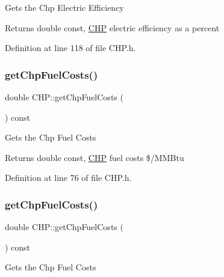 Gets the Chp Electric Efficiency

\begin{DoxyReturn}{Returns}
double const, \hyperlink{class_c_h_p}{C\+HP} electric efficiency as a percent 
\end{DoxyReturn}


Definition at line 118 of file C\+H\+P.\+h.

\mbox{\label{class_c_h_p_a00929ba5d10367258dc1dc437eda88e3}} 
\subsubsection{\texorpdfstring{get\+Chp\+Fuel\+Costs()}{getChpFuelCosts()}\hspace{0.1cm}{\footnotesize\ttfamily [1/3]}}
{\footnotesize\ttfamily double C\+H\+P\+::get\+Chp\+Fuel\+Costs (\begin{DoxyParamCaption}{ }\end{DoxyParamCaption}) const\hspace{0.3cm}{\ttfamily [inline]}}

Gets the Chp Fuel Costs

\begin{DoxyReturn}{Returns}
double const, \hyperlink{class_c_h_p}{C\+HP} fuel costs \$/\+M\+M\+Btu 
\end{DoxyReturn}


Definition at line 76 of file C\+H\+P.\+h.

\mbox{\label{class_c_h_p_a00929ba5d10367258dc1dc437eda88e3}} 
\subsubsection{\texorpdfstring{get\+Chp\+Fuel\+Costs()}{getChpFuelCosts()}\hspace{0.1cm}{\footnotesize\ttfamily [2/3]}}
{\footnotesize\ttfamily double C\+H\+P\+::get\+Chp\+Fuel\+Costs (\begin{DoxyParamCaption}{ }\end{DoxyParamCaption}) const\hspace{0.3cm}{\ttfamily [inline]}}

Gets the Chp Fuel Costs

